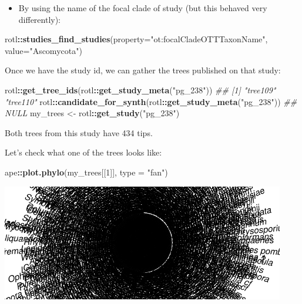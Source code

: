 \documentclass[10pt,a4paper,onecolumn]{article}
\newenvironment{Shaded}{\begin{snugshade}}{\end{snugshade}}
\newcommand{\CommentTok}[1]{\textcolor[rgb]{0.56,0.35,0.01}{\textit{#1}}}
\newcommand{\DataTypeTok}[1]{\textcolor[rgb]{0.13,0.29,0.53}{#1}}
\newcommand{\DecValTok}[1]{\textcolor[rgb]{0.00,0.00,0.81}{#1}}
\newcommand{\KeywordTok}[1]{\textcolor[rgb]{0.13,0.29,0.53}{\textbf{#1}}}
\newcommand{\NormalTok}[1]{#1}
\newcommand{\OperatorTok}[1]{\textcolor[rgb]{0.81,0.36,0.00}{\textbf{#1}}}
\newcommand{\StringTok}[1]{\textcolor[rgb]{0.31,0.60,0.02}{#1}}
\providecommand{\tightlist}{%
  \setlength{\itemsep}{0pt}\setlength{\parskip}{0pt}}
\begin{document}
\begin{itemize}
\tightlist
\item
  By using the name of the focal clade of study (but this behaved very
  differently):
\end{itemize}

\begin{Shaded}
\begin{Highlighting}[]
\NormalTok{rotl}\OperatorTok{::}\KeywordTok{studies_find_studies}\NormalTok{(}\DataTypeTok{property=}\StringTok{"ot:focalCladeOTTTaxonName"}\NormalTok{, }\DataTypeTok{value=}\StringTok{"Ascomycota"}\NormalTok{)}
\end{Highlighting}
\end{Shaded}

Once we have the study id, we can gather the trees published on that
study:

\begin{Shaded}
\begin{Highlighting}[]
\NormalTok{rotl}\OperatorTok{::}\KeywordTok{get_tree_ids}\NormalTok{(rotl}\OperatorTok{::}\KeywordTok{get_study_meta}\NormalTok{(}\StringTok{"pg_238"}\NormalTok{))}
\CommentTok{## [1] "tree109" "tree110"}
\NormalTok{rotl}\OperatorTok{::}\KeywordTok{candidate_for_synth}\NormalTok{(rotl}\OperatorTok{::}\KeywordTok{get_study_meta}\NormalTok{(}\StringTok{"pg_238"}\NormalTok{))}
\CommentTok{## NULL}
\NormalTok{my_trees <-}\StringTok{ }\NormalTok{rotl}\OperatorTok{::}\KeywordTok{get_study}\NormalTok{(}\StringTok{"pg_238"}\NormalTok{)}
\end{Highlighting}
\end{Shaded}

Both trees from this study have 434 tips.

Let's check what one of the trees looks like:

\begin{Shaded}
\begin{Highlighting}[]
\NormalTok{ape}\OperatorTok{::}\KeywordTok{plot.phylo}\NormalTok{(my_trees[[}\DecValTok{1}\NormalTok{]], }\DataTypeTok{type =} \StringTok{"fan"}\NormalTok{)}
\end{Highlighting}
\end{Shaded}

\includegraphics[width=468px]{physcraper_ms_ 2020-05-05_files/figure-latex/fungi-phylo-1}
\end{document}
